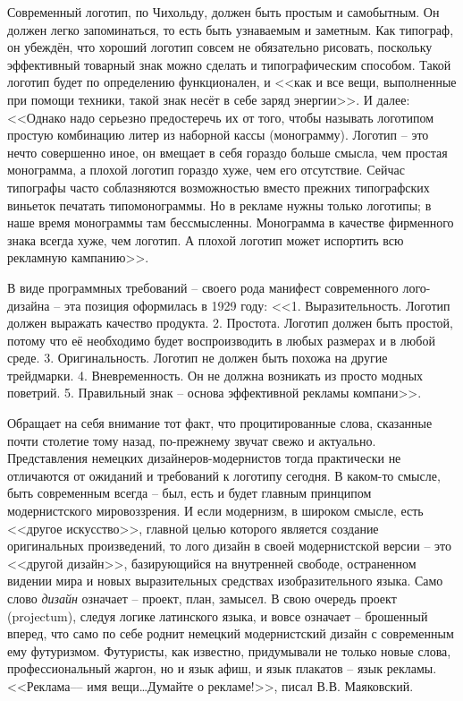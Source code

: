 Современный логотип, по Чихольду, должен быть простым и самобытным. Он должен легко запоминаться, то
есть быть узнаваемым и заметным. Как типограф, он убеждён, что хороший логотип совсем не обязательно
рисовать, поскольку эффективный товарный знак можно сделать и типографическим способом. Такой
логотип будет по определению функционален, и <<как и все вещи, выполненные при помощи техники, такой
знак несёт в себе заряд энергии>>\autocite[][118]{chihold2011}. И далее: <<Однако надо серьезно
предостеречь их от того, чтобы называть логотипом простую комбинацию литер из наборной кассы
(монограмму). Логотип -- это нечто совершенно иное, он вмещает в себя гораздо больше смысла, чем
простая монограмма, а плохой логотип гораздо хуже, чем его отсутствие. Сейчас типографы часто
соблазняются возможностью вместо прежних типографских виньеток печатать типомонограммы. Но в рекламе
нужны только логотипы; в наше время монограммы там бессмысленны. Монограмма в качестве фирменного
знака всегда хуже, чем логотип. А плохой логотип может испортить всю рекламную кампанию>>.
\autocite[][119]{chihold2011}

В виде программных требований -- своего рода манифест современного лого-дизайна -- эта позиция
оформилась в 1929 году: <<1. Выразительность. Логотип должен выражать качество
продукта. 2. Простота. Логотип должен быть простой, потому что её необходимо будет воспроизводить в
любых размерах и в любой среде. 3. Оригинальность. Логотип не должен быть похожа на другие
трейдмарки. 4. Вневременность. Он не должна возникать из просто модных поветрий. 5. Правильный знак
– основа эффективной рекламы компани>>. \autocite{cabarga1982treasury}

Обращает на себя внимание тот факт, что процитированные слова, сказанные почти столетие тому назад,
по-прежнему звучат свежо и актуально. Представления немецких дизайнеров-модернистов тогда
практически не отличаются от ожиданий и требований к логотипу сегодня. В каком-то смысле, быть
современным всегда -- был, есть и будет главным принципом модернистского мировоззрения. И если
модернизм, в широком смысле, есть <<другое искусство>>, главной целью которого является создание
оригинальных произведений, то лого дизайн в своей модернистской версии -- это <<другой дизайн>>,
базирующийся на внутренней свободе, остраненном видении мира и новых выразительных средствах
изобразительного языка. Само слово \emph{дизайн} означает -- проект, план, замысел. В свою очередь
проект (projectum), следуя логике латинского языка, и вовсе означает -- брошенный вперед, что само
по себе роднит немецкий модернистский дизайн с современным ему футуризмом. Футуристы, как известно,
придумывали не только новые слова, профессиональный жаргон, но и язык афиш, и язык плакатов -- язык
рекламы. <<Реклама--– имя вещи\ldots Думайте о рекламе!>>, писал
В.В. Маяковский.\autocite{mayakovsky1959}

